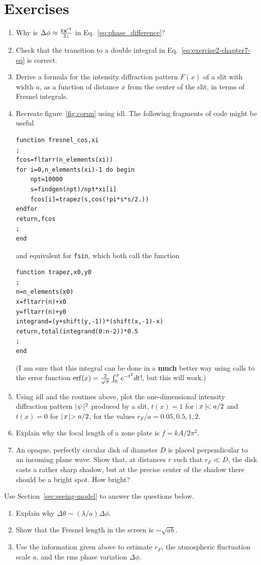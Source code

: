 \section{Exercises}
\begin{enumerate}
	\item Why is $\Delta\phi\approx {k{\bf x'}^2\over 2z}$ in Eq.~\ref{eq:phase_difference}?
	\item Check that the transition to a double integral in Eq.~\ref{eq:exercise2-chapter7-eq}
		is correct.
	\item Derive a formula for the intensity diffraction pattern $F(x)$ of a slit with width
		$a$, as a
		function of distance $x$ from the center of the slit, in terms of Fresnel integrals. 
	\item Recreate figure~\ref{fig:cornu} using {\sc idl}. The following fragments of code might 
		be useful
\belowcaptionskip=-10pt
\begin{lstlisting}[caption=Useful code I]
function fresnel_cos,xi
;
fcos=fltarr(n_elements(xi))
for i=0,n_elements(xi)-1 do begin
	npt=10000
	s=findgen(npt)/npt*xi[i]
	fcos[i]=trapez(s,cos(!pi*s*s/2.))
endfor
return,fcos
;
end
\end{lstlisting}
and equivalent for {\tt fsin}, which both call the function
\belowcaptionskip=-10pt
\begin{lstlisting}[caption=Useful code II]
function trapez,x0,y0
;
n=n_elements(x0)
x=fltarr(n)+x0
y=fltarr(n)+y0
integrand=(y+shift(y,-1))*(shift(x,-1)-x)
return,total(integrand(0:n-2))*0.5
;
end
\end{lstlisting}
(I am sure that this integral can be done in a {\bf much} better way
using calls to the error function ${\rm
  erf}(x)={2\over\sqrt{\pi}}\int_0^xe^{-t^2}dt$!, but this will work.)
\item Using {\sc idl}  and the routines above, plot the one-dimensional intensity diffraction pattern
  $\mid\!\psi\!\mid^2$ produced by a slit, $t(x)=1$ for $\!\mid x\mid\!<
  {a/2}$ and $t(x)=0$ for $\mid\! x\!\mid > {a/2}$, for the values
  ${r_F/a}=0.05, 0.5, 1, 2$.
\item Explain why the focal length of a zone plate is $f={kA/2\pi^2}$. 
\item An opaque, perfectly circular disk of diameter $D$ is placed perpendicular
	to an incoming plane wave. Show that, at distances $r$ such that $r_F\ll D$, the
	disk casts a rather sharp shadow, but at the precise center of the shadow there
	should be a bright spot. How bright?
\end{enumerate}
\hspace{8pt} Use Section~\ref{sec:seeing-model} to answer the questions below.
\begin{enumerate}[resume]
\item Explain why $\Delta\theta\sim({\lambda/a})\Delta\phi$.
\item Show that the Fresnel length in the screen is $\sim\sqrt{ab}$. 
\item Use the information given above to estimate $r_F$, the atmospheric fluctuation
scale $a$, and the rms phase variation $\Delta\phi$.
\end{enumerate}
